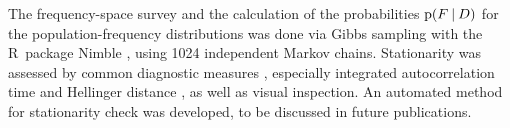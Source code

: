 \documentclass[utf8]{FrontiersinHarvard_mod} %
\newcommand*{\wrench}{{\fontencoding{U}\fontfamily{fontawesomethree}\selectfont\symbol{114}}}
\newcommand*{\pencil}{{\fontencoding{U}\fontfamily{fontawesometwo}\selectfont\symbol{210}}}
\newcommand{\mynotew}[1]{{\color{notecolour}\wrench\ #1}}
\newcommand{\mynotep}[1]{{\color{notecolour}\pencil\ #1}}
\newcommand*{\sect}{\S}%
\newcommand*{\sects}{\S\S}%
\newcommand*{\chap}{ch.}%
\newcommand*{\eg}{{e.g.}}
\newcommand*{\p}{\mathrm{p}}%
\renewcommand*{\|}[1][]{\nonscript\:#1\vert\nonscript\:\mathopen{}}
\newcommand*{\ljm}{Ledley-Jaynes machine}
\begin{document}
The frequency-space survey and the calculation of the probabilities $\p(F\|D)$ for the population-frequency distributions was done via Gibbs sampling \citetext{\citealp[\chap~4]{neal1993}; \citealp[\sect\,29.5]{mackay1995_r2005}; \citealp{casellaetal1992}} with the R~package Nimble \citep{nimble2016_r2021}, using 1024 independent Markov chains. Stationarity was assessed by common diagnostic measures \citep{gilksetal1998}, especially integrated autocorrelation time \citep{christenetal2010} and Hellinger distance \citep{booneetal2014}, as well as visual inspection. An automated method for stationarity check was developed, to be discussed in future publications.





\end{document}
